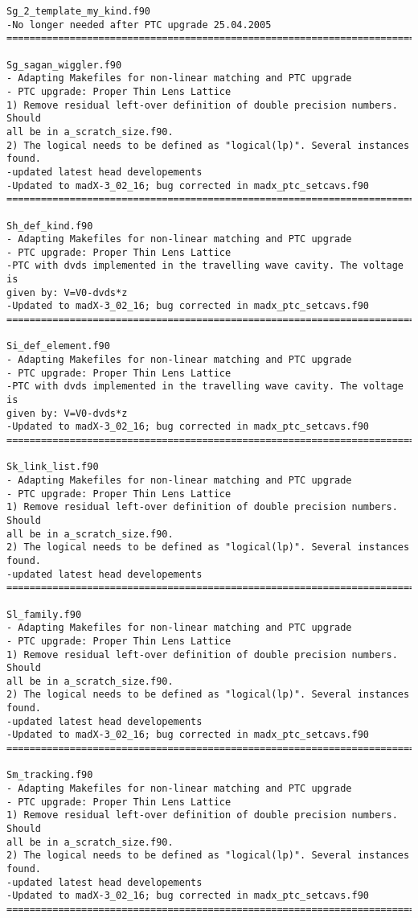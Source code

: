 \begin{verbatim}
Sg_2_template_my_kind.f90
-No longer needed after PTC upgrade 25.04.2005
=============================================================================

Sg_sagan_wiggler.f90
- Adapting Makefiles for non-linear matching and PTC upgrade
- PTC upgrade: Proper Thin Lens Lattice
1) Remove residual left-over definition of double precision numbers. Should
all be in a_scratch_size.f90.
2) The logical needs to be defined as "logical(lp)". Several instances found.
-updated latest head developements
-Updated to madX-3_02_16; bug corrected in madx_ptc_setcavs.f90
=============================================================================

Sh_def_kind.f90
- Adapting Makefiles for non-linear matching and PTC upgrade
- PTC upgrade: Proper Thin Lens Lattice
-PTC with dvds implemented in the travelling wave cavity. The voltage is
given by: V=V0-dvds*z
-Updated to madX-3_02_16; bug corrected in madx_ptc_setcavs.f90
=============================================================================

Si_def_element.f90
- Adapting Makefiles for non-linear matching and PTC upgrade
- PTC upgrade: Proper Thin Lens Lattice
-PTC with dvds implemented in the travelling wave cavity. The voltage is
given by: V=V0-dvds*z
-Updated to madX-3_02_16; bug corrected in madx_ptc_setcavs.f90
=============================================================================

Sk_link_list.f90
- Adapting Makefiles for non-linear matching and PTC upgrade
- PTC upgrade: Proper Thin Lens Lattice
1) Remove residual left-over definition of double precision numbers. Should
all be in a_scratch_size.f90.
2) The logical needs to be defined as "logical(lp)". Several instances found.
-updated latest head developements
=============================================================================

Sl_family.f90
- Adapting Makefiles for non-linear matching and PTC upgrade
- PTC upgrade: Proper Thin Lens Lattice
1) Remove residual left-over definition of double precision numbers. Should
all be in a_scratch_size.f90.
2) The logical needs to be defined as "logical(lp)". Several instances found.
-updated latest head developements
-Updated to madX-3_02_16; bug corrected in madx_ptc_setcavs.f90
=============================================================================

Sm_tracking.f90
- Adapting Makefiles for non-linear matching and PTC upgrade
- PTC upgrade: Proper Thin Lens Lattice
1) Remove residual left-over definition of double precision numbers. Should
all be in a_scratch_size.f90.
2) The logical needs to be defined as "logical(lp)". Several instances found.
-updated latest head developements
-Updated to madX-3_02_16; bug corrected in madx_ptc_setcavs.f90
=============================================================================


\end{verbatim}
